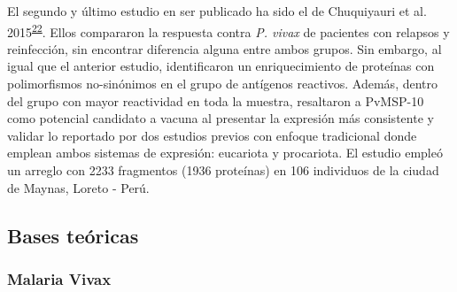 \documentclass[]{article}
\begin{document}
\begin{enumerate}
  El segundo y último estudio en ser publicado ha sido el de Chuquiyauri
  et al.
  2015\textsuperscript{\protect\hyperlink{ref-chuquiyauri2015vivax}{22}}.
  Ellos compararon la respuesta contra \emph{P. vivax} de pacientes con
  relapsos y reinfección, sin encontrar diferencia alguna entre ambos
  grupos. Sin embargo, al igual que el anterior estudio, identificaron
  un enriquecimiento de proteínas con polimorfismos no-sinónimos en el
  grupo de antígenos reactivos. Además, dentro del grupo con mayor
  reactividad en toda la muestra, resaltaron a PvMSP-10 como potencial
  candidato a vacuna al presentar la expresión más consistente y validar
  lo reportado por dos estudios previos con enfoque tradicional donde
  emplean ambos sistemas de expresión: eucariota y procariota. El
  estudio empleó un arreglo con 2233 fragmentos (1936 proteínas) en 106
  individuos de la ciudad de Maynas, Loreto - Perú.
\end{enumerate}

\subsection{Bases teóricas}\label{bases-teoricas}

\subsubsection{Malaria Vivax}\label{malaria-vivax}
\end{document}
